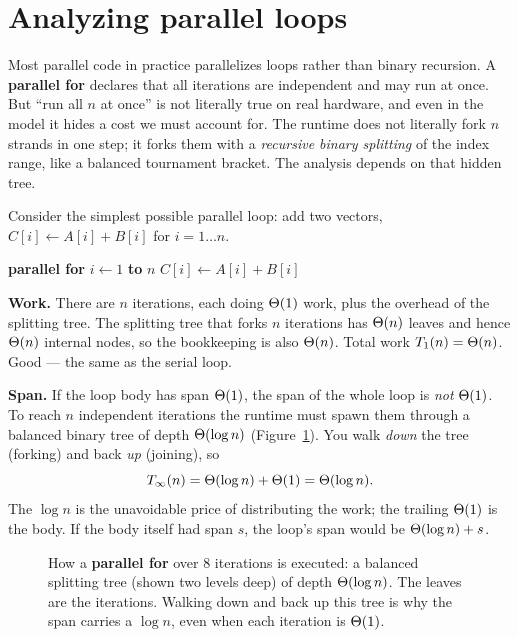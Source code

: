 \section{Analyzing parallel loops}

Most parallel code in practice parallelizes loops rather than binary recursion. A \textbf{parallel
for} declares that all iterations are independent and may run at once. But ``run
all $n$ at once'' is not literally true on real hardware, and even in the model it hides a cost
we must account for. The runtime does not literally fork $n$ strands in one step;
it forks them with a \emph{recursive binary splitting} of the index range, like a
balanced tournament bracket. The analysis depends on that hidden tree.

Consider the simplest possible parallel loop: add two vectors,
$C[i] \gets A[i] + B[i]$ for $i = 1 \ldots n$.

\begin{algorithm}[H]
\caption{\textsc{Vector-Add}$(A, B, C, n)$}
\textbf{parallel for} $i \gets 1$ \textbf{to} $n$\;
\Indp $C[i] \gets A[i] + B[i]$\;
\Indm
\end{algorithm}

\textbf{Work.} There are $n$ iterations, each doing $\Theta(1)$ work, plus the
overhead of the splitting tree. The splitting tree that forks $n$ iterations has
$\Theta(n)$ leaves and hence $\Theta(n)$ internal nodes, so the bookkeeping is also
$\Theta(n)$. Total work $T_1(n) = \Theta(n)$. Good --- the same as the serial loop.

\textbf{Span.} If the loop body has span
$\Theta(1)$, the span of the whole loop is \emph{not} $\Theta(1)$. To reach $n$
independent iterations the
runtime must spawn them through a balanced binary tree of depth $\Theta(\log n)$
(Figure~\ref{ch35:loop-tree}). You
walk \emph{down} the tree (forking) and back \emph{up} (joining), so
\[
T_\infty(n) = \Theta(\log n) + \Theta(1) = \Theta(\log n).
\]
The $\log n$ is the unavoidable price of distributing the work; the trailing
$\Theta(1)$ is the body. If the body itself had span $s$, the loop's span would be
$\Theta(\log n) + s$.

\begin{figure}[h]
\centering
{}
\caption{How a \textbf{parallel for} over $8$ iterations is executed: a
balanced splitting tree (shown two levels deep) of depth $\Theta(\log n)$. The leaves
are the iterations. Walking down and back up this tree is why the span carries a
$\log n$, even when each iteration is $\Theta(1)$.}
\label{ch35:loop-tree}
\end{figure}

